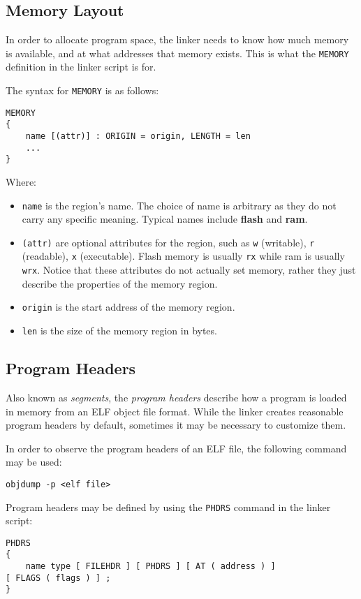 \documentclass[a4paper,12pt,twoside]{report}
\begin{document}
            \subsection{Memory Layout}
                In order to allocate program space, the linker needs to know how much memory is available, and at what addresses that memory exists. This is what the \verb|MEMORY| definition in the linker script is for.

                The syntax for \verb|MEMORY| is as follows:
                \begin{verbatim}
MEMORY
{
    name [(attr)] : ORIGIN = origin, LENGTH = len
    ...
}
                \end{verbatim}
            	Where:
            	\begin{itemize}
            		\item \verb|name| is the region's name. The choice of name is arbitrary as they do not carry any specific meaning. Typical names include \textbf{flash} and \textbf{ram}.
            		\item \verb|(attr)| are optional attributes for the region, such as \verb|w| (writable), \verb|r| (readable), \verb|x| (executable). Flash memory is usually \verb|rx| while ram is usually \verb|wrx|. Notice that these attributes do not actually set memory, rather they just describe the properties of the memory region.
            		\item \verb|origin| is the start address of the memory region.
            		\item \verb|len| is the size of the memory region in bytes.
            	\end{itemize}

            \subsection{Program Headers}
                Also known as \textit{segments}, the \textit{program headers} describe how a program is loaded in memory from an ELF object file format. While the linker creates reasonable program headers by default, sometimes it may be necessary to customize them.\cite{gnuldProgramHeaders}

                In order to observe the program headers of an ELF file, the following command may be used:
\begin{verbatim}
objdump -p <elf file>
\end{verbatim}

                Program headers may be defined by using the \lstinline|PHDRS| command in the linker script:
\begin{verbatim}
PHDRS
{
    name type [ FILEHDR ] [ PHDRS ] [ AT ( address ) ]
[ FLAGS ( flags ) ] ;
}
\end{verbatim}
\end{document}
